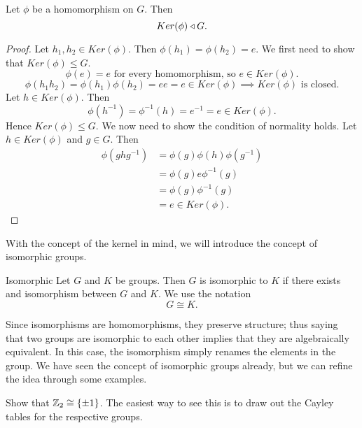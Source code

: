 \begin{theorem}{}
    Let $\phi$ be a homomorphism on $G$. Then
    \[
        Ker(\phi)\triangleleft G.
    \]
\end{theorem}
\begin{proof}
    Let $h_{1},h_{2}\in Ker(\phi)$. Then $\phi(h_{1})=\phi(h_{2})=e$. We first need to show that $Ker(\phi)\leq G$.
    \[
        \phi(e)=e\text{ for every homomorphism, so } e\in Ker(\phi).
    \]
    \[
        \phi(h_{1}h_{2})=\phi(h_{1})\phi(h_{2})=ee=e\in Ker(\phi)\implies Ker(\phi)\text{ is closed.}
    \]
    Let $h\in Ker(\phi)$. Then
    \[
        \phi(h^{-1})=\phi^{-1}(h)=e^{-1}=e\in Ker(\phi).
    \]
    Hence $Ker(\phi)\leq G$. We now need to show the condition of normality holds.
    Let $h\in Ker(\phi)$ and $g\in G$. Then
    \begin{align*}
        \phi(ghg^{-1}) &= \phi(g)\phi(h)\phi(g^{-1})\\
        &= \phi(g)e\phi^{-1}(g)\\
        &= \phi(g)\phi^{-1}(g)\\
        &= e\in Ker(\phi).
    \end{align*}
\end{proof}

With the concept of the kernel in mind, we will introduce the concept of isomorphic groups.
\begin{definition}{Isomorphic}
    Let $G$ and $K$ be groups. Then $G$ is isomorphic to $K$ if there exists and isomorphism between $G$ and $K$. We use the notation
    \[
        G\cong K.
    \]
\end{definition}

Since isomorphisms are homomorphisms, they preserve structure; thus saying that two groups are isomorphic to each other implies that they are algebraically equivalent.
In this case, the isomorphism simply renames the elements in the group.
We have seen the concept of isomorphic groups already, but we can refine the idea through some examples.

\begin{example}{Show that $\mathbb{Z}_{2}\cong \{\pm 1\}$.}
    The easiest way to see this is to draw out the Cayley tables for the respective groups.
    \begin{center}
        
    \end{center}
\end{example}
